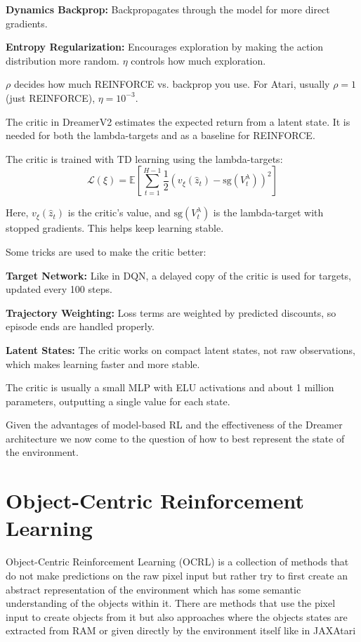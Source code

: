 \documentclass[
	english,
	ruledheaders=section,
	class=report,
	thesis={type=master},
	accentcolor=9c,
	custommargins=true,
	marginpar=false,
	parskip=half-,
	fontsize=11pt,
]{tudapub}
\begin{document}
\textbf{Dynamics Backprop:} Backpropagates through the model for more direct gradients.

\textbf{Entropy Regularization:} Encourages exploration by making the action distribution more random. $\eta$ controls how much exploration.

$\rho$ decides how much REINFORCE vs. backprop you use. For Atari, usually $\rho=1$ (just REINFORCE), $\eta=10^{-3}$.

The critic in DreamerV2 estimates the expected return from a latent state. It
is needed for both the lambda-targets and as a baseline for REINFORCE.

The critic is trained with TD learning using the lambda-targets:
\begin{equation}
	\mathcal{L}(\xi) = \mathbb{E}\left[\sum_{t=1}^{H-1} \frac{1}{2} \left(v_\xi(\hat{z}_t) - \text{sg}(V^{\lambda}_t)\right)^2\right]
\end{equation}

Here, $v_\xi(\hat{z}_t)$ is the critic's value, and $\text{sg}(V^{\lambda}_t)$
is the lambda-target with stopped gradients. This helps keep learning stable.

Some tricks are used to make the critic better:

\textbf{Target Network:} Like in DQN, a delayed copy of the critic is used for targets, updated every 100 steps.

\textbf{Trajectory Weighting:} Loss terms are weighted by predicted discounts, so episode ends are handled properly.

\textbf{Latent States:} The critic works on compact latent states, not raw observations, which makes learning faster and more stable.

The critic is usually a small MLP with ELU activations and about 1 million
parameters, outputting a single value for each state.

Given the advantages of model-based RL and the effectiveness of the Dreamer
architecture we now come to the question of how to best represent the state of
the environment.

\section{Object-Centric Reinforcement Learning}
\label{sec:object_centric_rl}

Object-Centric Reinforcement Learning (OCRL) is a collection of methods that do
not make predictions on the raw pixel input but rather try to first create an
abstract representation of the environment which has some semantic
understanding of the objects within it. There are methods that use the pixel
input to create objects from it \cite{greff2020object} but also approaches
where the objects states are extracted from RAM \cite{delfosse2023ocatari} or
given directly by the environment itself like in JAXAtari
\end{document}
